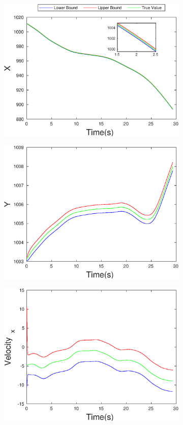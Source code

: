 \begin{figure}[h]
\begin{subfigure}{.5\linewidth}
\centering
\includegraphics[width=\linewidth]{figures/Frad/s3cvSMX}
\end{subfigure}
\begin{subfigure}{.5\linewidth}
\centering
\includegraphics[width=\linewidth]{figures/Frad/s3cvSMY}
\end{subfigure}
\begin{subfigure}{.5\linewidth}
\centering
\includegraphics[width=.9\linewidth]{figures/Frad/s3cvSMVelocity_x}

\end{subfigure}
\end{figure}
